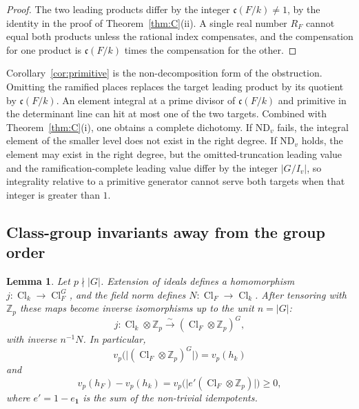 \documentclass[11pt]{article}
\theoremstyle{plain}
\newtheorem{lemma}[theorem]{Lemma}
\theoremstyle{definition}
\theoremstyle{remark}
\newcommand{\Z}{\mathbb{Z}}
\newcommand{\Cl}{\operatorname{Cl}}
\newcommand{\triv}{\mathbf{1}}
\begin{document}
\begin{proof}
The two leading products differ by the integer $\mathfrak{c}(F/k)\neq 1$, by the identity in the proof of Theorem~\ref{thm:C}(ii).
A single real number $R_F$ cannot equal both products unless the rational index compensates, and the compensation for one product is $\mathfrak{c}(F/k)$ times the compensation for the other.
\end{proof}

Corollary~\ref{cor:primitive} is the non-decomposition form of the obstruction.
Omitting the ramified places replaces the target leading product by its quotient by $\mathfrak{c}(F/k)$.
An element integral at a prime divisor of $\mathfrak{c}(F/k)$ and primitive in the determinant line can hit at most one of the two targets.
Combined with Theorem~\ref{thm:C}(i), one obtains a complete dichotomy.
If $\mathrm{ND}_v$ fails, the integral element of the smaller level does not exist in the right degree.
If $\mathrm{ND}_v$ holds, the element may exist in the right degree, but the omitted-truncation leading value and the ramification-complete leading value differ by the integer $|G/I_v|$, so integrality relative to a primitive generator cannot serve both targets when that integer is greater than $1$.

\subsection{Class-group invariants away from the group order}

\begin{lemma}
\label{lem:invariants}
Let $p\nmid|G|$.
Extension of ideals defines a homomorphism $j:\Cl_k\to\Cl_F^{G}$, and the field norm defines $N:\Cl_F\to\Cl_k$.
After tensoring with $\Z_p$ these maps become inverse isomorphisms up to the unit $n=|G|$:
\[
  j:\Cl_k\otimes\Z_p\xrightarrow{\sim}(\Cl_F\otimes\Z_p)^{G},
\]
with inverse $n^{-1}N$.
In particular,
\[
  v_p\bigl(\bigl|(\Cl_F\otimes\Z_p)^{G}\bigr|\bigr)=v_p(h_k)
\]
and
\begin{equation}
\label{eq:split}
  v_p(h_F)-v_p(h_k)
  =v_p\bigl(\bigl|e'(\Cl_F\otimes\Z_p)\bigr|\bigr)\ge 0,
\end{equation}
where $e'=1-e_{\triv}$ is the sum of the non-trivial idempotents.
\end{lemma}
\end{document}
